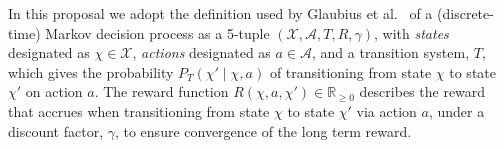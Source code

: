 In this proposal we adopt the definition used by Glaubius et al.~\cite{gtsg08}
of a (discrete-time) Markov decision process as a 5-tuple
$(\mathcal{X}, \mathcal{A}, T, R, \gamma)$, with \emph{states} designated
as $\chi \in \mathcal{X}$, \emph{actions} designated as $a \in \mathcal{A}$,
and a transition system, $T$, which gives the probability
$P_T (\chi' \mid \chi, a)$ of transitioning from state $\chi$ to
state $\chi'$ on action $a$.
The reward function $R(\chi, a, \chi') \in \mathbb R_{\ge 0}$ describes the
reward that accrues when transitioning from state $\chi$ to
state $\chi'$ via action $a$, under a discount factor, $\gamma$,
to ensure convergence of the long term reward.


